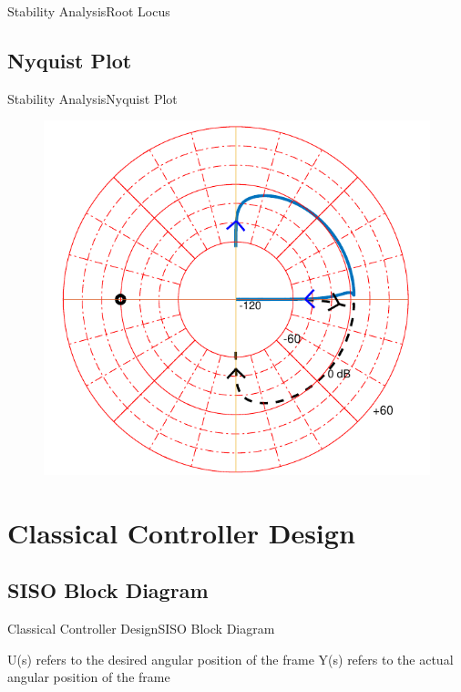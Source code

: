 \begin{frame}{Stability Analysis}{Root Locus}
\begin{minipage}{\linewidth}
\begin{minipage}{0.45\linewidth}
\begin{figure}[H]
			\centering
		\end{figure}
	\end{minipage}
\end{minipage}
\end{frame}

\subsection{Nyquist Plot}
\begin{frame}{Stability Analysis}{Nyquist Plot}
\begin{figure}
		\includegraphics[scale=.5]{Pictures/nyquistCubli}
		\centering
\end{figure}
	
\end{frame}

\section{Classical Controller Design}

\subsection{SISO Block Diagram}
\begin{frame}{Classical Controller Design}{SISO Block Diagram}	
\begin{figure}
	
\end{figure}
\vspace{.2cm}

\centering
U(s) refers to the desired angular position of the frame \linebreak
\linebreak
Y(s) refers to the actual angular position of the frame

\end{frame}

